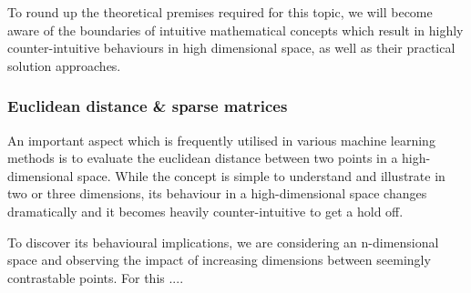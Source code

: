 
To round up the theoretical premises required for this topic, we will become aware of the boundaries of intuitive mathematical concepts which result in highly counter-intuitive behaviours in high dimensional space, as well as their practical solution approaches.

\subsubsection{Euclidean distance \& sparse matrices}

An important aspect which is frequently utilised in various machine learning methods is to evaluate the euclidean distance between two points in a high-dimensional space.
While the concept is simple to understand and illustrate in two or three dimensions, its behaviour in a high-dimensional space changes dramatically and it becomes heavily counter-intuitive to get a hold off.

To discover its behavioural implications, we are considering an n-dimensional space and observing the impact of increasing dimensions between seemingly contrastable points. 
For this .... 

\vspace{2mm}

